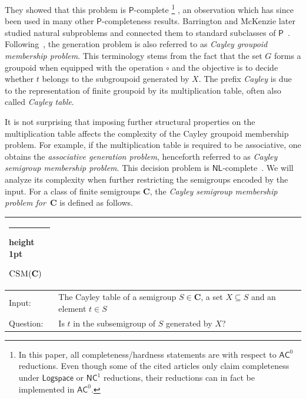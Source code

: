 \documentclass[11pt]{article}
\makeatletter
\numberwithin{equation}{section}
\theoremstyle{definition}
\theoremstyle{plain}
\newcommand{\AC}{\ensuremath{\mathsf{AC}}}
\newcommand{\NC}{\ensuremath{\mathsf{NC}}}
\newcommand{\PTIME}{\ensuremath{\mathsf{P}}}
\newcommand{\LOGSPACE}{\ensuremath{\mathsf{Logspace}}}
\newcommand{\NL}{\ensuremath{\mathsf{NL}}}
\newcommand{\vC}{\mathbf{C}}
\newcommand{\CSM}{\ensuremath{\textsc{CSM}}}
\newcommand{\SCGM}{Cayley groupoid membership}
\newcommand{\SCSM}{Cayley semigroup membership}
\newcommand{\SCGMP}{{\SCGM} problem}
\newcommand{\SCSMP}{{\SCSM} problem}
\newcommand{\thickhline}{%
    \noalign {\ifnum 0=`}\fi \hrule height 1pt
    \futurelet \reserved@a \@xhline
}
\makeatother
\begin{document}
They showed that this problem is $\PTIME$-complete%
%
%
%
%
\footnote{In this paper, all completeness/hardness statements
are with respect to $\AC^0$ reductions.  Even though some of the
cited articles only claim completeness under $\LOGSPACE$ or $\NC^1$
reductions, their reductions can in fact be implemented in $\AC^0$.} %
\cite{JonesL76}, an observation which has since been used in many 
other $\PTIME$-completeness results.
%
Barrington and McKenzie later studied natural subproblems and connected them to
standard subclasses of $\PTIME$~\cite{BarringtonM91}.
%
Following~\cite{BarringtonKLM01}, the generation problem is also referred to as
\emph{\SCGMP}.
%
This terminology stems from the fact that the set $G$ forms a groupoid when
equipped with the operation $\circ$ and the objective is to decide whether $t$
belongs to the subgroupoid generated by $X$.
%
The prefix \emph{Cayley} is due to the representation of finite groupoid by its
multiplication table, often also called \emph{Cayley table}.

It is not surprising that imposing further structural properties on the
multiplication table affects the complexity of the {\SCGMP}.
%
For example, if the multiplication table is required to be associative, one
obtains the \emph{associative generation problem}, henceforth referred to as
\emph{\SCSMP}.
%
This decision problem is $\NL$-complete~\cite{JonesLL76}.
%
We will analyze its complexity when further restricting the semigroups encoded
by the input.
%
For a class of finite semigroups $\vC$, the \emph{{\SCSMP} for~$\vC$} is
defined as follows.
\vspace{1em}

\noindent
\begin{tabularx}{\textwidth}{p{1.25cm}X}
  \thickhline
  $\CSM(\vC)$ \\
  \hline
  \textsf{Input}: & The Cayley table of a semigroup $S \in \vC$, a set $X \subseteq S$ and an element $t \in S$ \\
  \textsf{Question}: & Is $t$ in the subsemigroup of $S$ generated by $X$? \\
  \hline
\end{tabularx}
\vspace{1ex}
\end{document}
